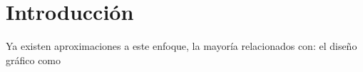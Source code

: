 \chapter*{Introducción}


\label{sect:justificacion}

Ya existen aproximaciones a este enfoque, la mayoría relacionados con: el diseño gráfico como 
